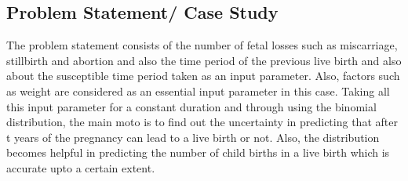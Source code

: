 \documentclass{article}
\begin{document}
\subsection{Problem Statement/ Case Study}
The problem statement consists of the number of fetal losses such as miscarriage, stillbirth and abortion and also the time period of the previous live birth and also about the susceptible time period taken as an input parameter. Also, factors such as weight are considered as an essential input parameter in this case. Taking all this input parameter for a constant duration and through using the binomial distribution, the main moto is to find out the uncertainty in predicting that after t years of the pregnancy can lead to a live birth or not. Also, the distribution becomes helpful in predicting the number of child births in a live birth which is accurate upto a certain extent.
\end{document}
